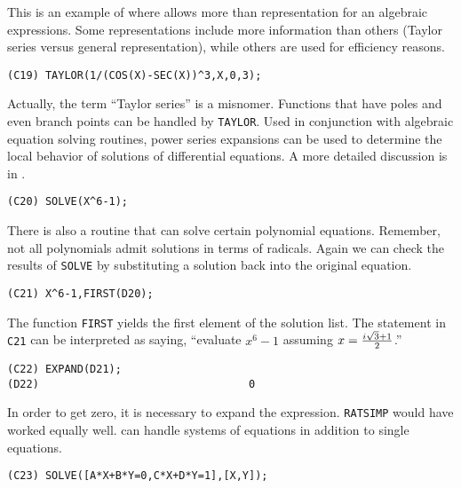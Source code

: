 This is an example of where {\Macsyma} allows more than representation
for an algebraic expressions.  Some representations include more
information than others (Taylor series versus general representation),
while others are used for efficiency reasons.

\begin{verbatim}
(C19) TAYLOR(1/(COS(X)-SEC(X))^3,X,0,3);
\end{verbatim}
Actually, the term ``Taylor series'' is a misnomer.  Functions that have
poles and even branch points can be handled by {\tt TAYLOR}.  Used in
conjunction with algebraic equation solving routines, power series
expansions can be used to determine the local behavior of solutions of
differential equations.  A more detailed discussion is in
.  
\begin{verbatim}
(C20) SOLVE(X^6-1);
\end{verbatim}

There is also a routine that can solve certain polynomial equations.
Remember, not all polynomials admit solutions in terms of radicals.
Again we can check the results of {\tt SOLVE} by substituting a solution
back into the original equation.
\begin{verbatim}
(C21) X^6-1,FIRST(D20);
\end{verbatim}
The function {\tt FIRST} yields the first element of the solution list.
The statement in {\tt C21} can be interpreted as saying, ``evaluate
$x^6 - 1$ assuming $x = {i \sqrt{3} + 1 \over 2}$.''
\begin{verbatim}
(C22) EXPAND(D21);
(D22)                                 0
\end{verbatim}
In order to get zero, it is necessary to expand the expression.  {\tt RATSIMP}
would have worked equally well.  {\Macsyma} can handle systems of equations 
in addition to single equations.
\begin{verbatim}
(C23) SOLVE([A*X+B*Y=0,C*X+D*Y=1],[X,Y]);
\end{verbatim}

